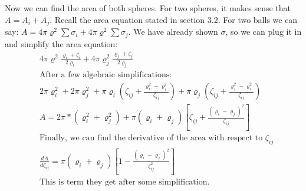 \documentclass{article}
\begin{document}
Now we can find the area of both spheres. For two spheres, it makes sense that $A = A_i + A_j$. Recall the area equation stated in section 3.2. For two balls we can say: $A = 4\pi\varrho^2\sum{\sigma_i} + 4\pi\varrho^2\sum{\sigma_j}$. We have already shown $\sigma$, so we can plug it in and simplify the area equation:
\begin{align*}
&4\pi\varrho^2\frac{\varrho_i + \zeta_i}{2\varrho_i} + 4\pi\varrho_j^2\frac{\varrho_j + \zeta_j}{2\varrho_j} \\
&\text{After a few algebraic simplifications:} \\
&2\pi\varrho_i^2 +2\pi\varrho_j^2 +\pi\varrho_i\left(\zeta_{ij} + \frac{\varrho_i^2 - \varrho_j^2}{\zeta_{ij}}\right)+\pi\varrho_j\left(\zeta_{ij} + \frac{\varrho_j^2 - \varrho_i^2}{\zeta_{ij}}\right) \\
&A  = 2\pi*(\varrho_i^2 + \varrho_j^2) + \pi(\varrho_i+\varrho_j)\left[\zeta_{ij}+\frac{(\varrho_i-\varrho_j)^2}{\zeta_{ij}}\right] \\
&\text{Finally, we can find the derivative of the area with respect to $\zeta_{ij}$} \\
&\frac{dA}{d\zeta_{ij}} = \pi(\varrho_i+\varrho_j)\left[1-\frac{(\varrho_i - \varrho_j)^2}{\zeta_{ij}^2}\right] \\
&\text{This is term they get after some simplification.}
\end{align*}
\end{document}
